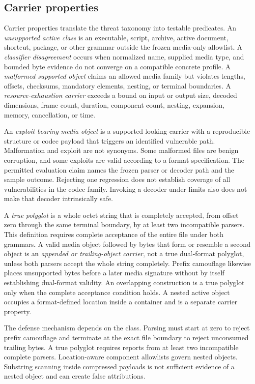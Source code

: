 \subsection{Carrier properties}

Carrier properties translate the threat taxonomy into testable predicates.
An \emph{unsupported active class} is an executable, script, archive, active
document, shortcut, package, or other grammar outside the frozen media-only
allowlist. A \emph{classifier disagreement} occurs when normalized name,
supplied media type, and bounded byte evidence do not converge on a compatible
concrete profile. A \emph{malformed supported object} claims an allowed media
family but violates lengths, offsets, checksums, mandatory elements, nesting,
or terminal boundaries. A \emph{resource-exhaustion carrier} exceeds a bound
on input or output size, decoded dimensions, frame count, duration, component
count, nesting, expansion, memory, cancellation, or time.

An \emph{exploit-bearing media object} is a supported-looking carrier with a
reproducible structure or codec payload that triggers an identified vulnerable
path. Malformation and exploit are not synonyms. Some malformed files are
benign corruption, and some exploits are valid according to a format
specification. The permitted evaluation claim names the frozen parser or
decoder path and the sample outcome. Rejecting one regression does not establish
coverage of all vulnerabilities in the codec family. Invoking a decoder under
limits also does not make that decoder intrinsically safe.

A \emph{true polyglot} is a whole octet string that is completely accepted,
from offset zero through the same terminal boundary, by at least two
incompatible parsers. This definition requires complete acceptance of the
entire file under both grammars. A valid media object followed by bytes that
form or resemble a second object is an \emph{appended or trailing-object
carrier}, not a true dual-format polyglot, unless both parsers accept the whole
string completely. Prefix camouflage likewise places unsupported bytes before
a later media signature without by itself establishing dual-format validity.
An overlapping construction is a true polyglot only when the complete
acceptance condition holds. A nested active object occupies a format-defined
location inside a container and is a separate carrier property.

The defense mechanism depends on the class. Parsing must start at zero to
reject prefix camouflage and terminate at the exact file boundary to reject
unconsumed trailing bytes. A true polyglot requires reports from at least two
incompatible complete parsers. Location-aware component allowlists govern
nested objects. Substring scanning inside compressed payloads is not sufficient
evidence of a nested object and can create false attributions.

